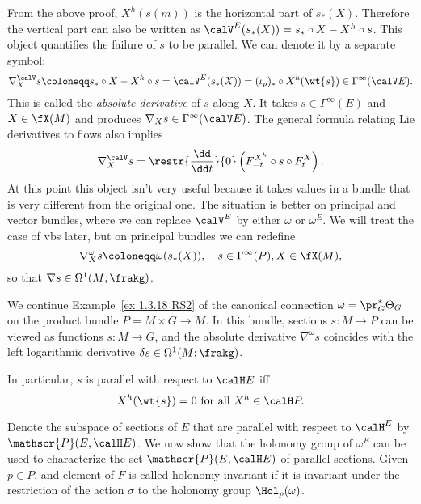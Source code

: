 \begin{rem}\label{rem absolute derivative}
    From the above proof, $X^h(s(m))$ is the horizontal part of $s_\ast(X)$. Therefore the vertical part can also be written as $\calV^E(s_\ast(X))=s_\ast\circ X-X^h\circ s$. This object quantifies the failure of $s$ to be parallel. We can denote it by a separate symbol:
    \[\nabla_X^{\calV} s\coloneqq s_\ast\circ X-X^h\circ s=\calV^E(s_\ast(X))=(\iota_p)_\ast\circ X^h(\wt{s})\in\Gamma^\infty(\calV E).\]
    This is called the \emph{absolute derivative} of $s$ along $X$. It takes $s\in\Gamma^\infty(E)$ and $X\in\fX(M)$ and produces $\nabla_X s\in \Gamma^\infty(\calV E)$. The general formula relating Lie derivatives to flows also implies
    \[\nabla_X^{\calV} s=\restr{\frac{\dd}{\dd t}}{0}\left(F^{X^h}_{-t}\circ s\circ F^X_t\right).\]
    At this point this object isn't very useful because it takes values in a bundle that is very different from the original one. The situation is better on principal and vector bundles, where we can replace $\calV^E$ by either $\omega$ or $\omega^E$. We will treat the case of \glspl{vb} later, but on principal bundles we can redefine
    \[\nabla_X^\omega s\coloneqq \omega(s_\ast(X)), \quad s\in\Gamma^\infty(P),X\in\fX(M),\]
    so that $\nabla s\in\Omega^1(M;\frakg)$.
\end{rem}


\begin{example}
    We continue Example~\ref{ex 1.3.18 RS2} of the canonical connection $\omega=\pr_G^\ast\Theta_G$ on the product bundle $P=M\times G\to M$. In this bundle, sections $s:M\to P$ can be viewed as functions $s:M\to G$, and the absolute derivative $\nabla^\omega s$ coincides with the left logarithmic derivative $\delta s\in\Omega^1(M;\frakg)$.
\end{example}



\begin{cor}\label{cor 1.5.7 RS2 my version}
    In particular, $s$ is parallel with respect to $\calH E$ iff
    \[X^h(\wt{s})=0\text{ for all }X^h\in\calH P.\]
\end{cor}


Denote the subspace of sections of $E$ that are parallel with respect to $\calH^E$ by $\mathscr{P}(E,\calH E)$.  We now show that the holonomy group of $\omega^E$ can be used to characterize the set $\mathscr{P}(E,\calH E)$ of parallel sections. Given $p\in P$, and element of $F$ is called holonomy-invariant if it is invariant under the restriction of the action $\sigma$ to the holonomy group $\Hol_p(\omega)$.

